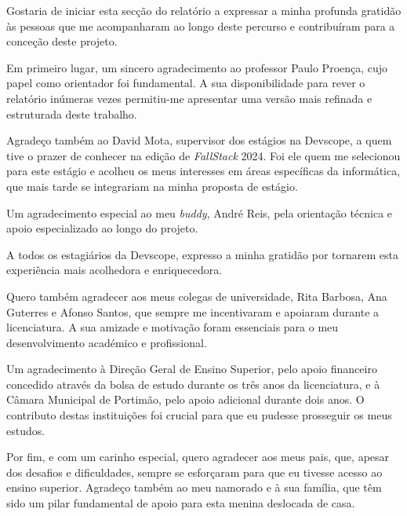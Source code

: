 \begin{acknowledgements}

Gostaria de iniciar esta secção do relatório a expressar a minha profunda gratidão às pessoas que me acompanharam ao longo deste percurso e contribuíram para a conceção deste projeto.

Em primeiro lugar, um sincero agradecimento ao professor Paulo Proença, cujo papel como orientador foi fundamental. A sua disponibilidade para rever o relatório inúmeras vezes permitiu-me apresentar uma versão mais refinada e estruturada deste trabalho.

Agradeço também ao David Mota, supervisor dos estágios na Devscope, a quem tive o prazer de conhecer na edição de \textit{FallStack} 2024. Foi ele quem me selecionou para este estágio e acolheu os meus interesses em áreas específicas da informática, que mais tarde se integrariam na minha proposta de estágio.

Um agradecimento especial ao meu \textit{buddy}, André Reis, pela orientação técnica e apoio especializado ao longo do projeto.

A todos os estagiários da Devscope, expresso a minha gratidão por tornarem esta experiência mais acolhedora e enriquecedora.

Quero também agradecer aos meus colegas de universidade, Rita Barbosa, Ana Guterres e Afonso Santos, que sempre me incentivaram e apoiaram durante a licenciatura. A sua amizade e motivação foram essenciais para o meu desenvolvimento académico e profissional.

Um agradecimento à Direção Geral de Ensino Superior, pelo apoio financeiro concedido através da bolsa de estudo durante os três anos da licenciatura, e à Câmara Municipal de Portimão, pelo apoio adicional durante dois anos. O contributo destas instituições foi crucial para que eu pudesse prosseguir os meus estudos.

Por fim, e com um carinho especial, quero agradecer aos meus pais, que, apesar dos desafios e dificuldades, sempre se esforçaram para que eu tivesse acesso ao ensino superior. Agradeço também ao meu namorado e à sua família, que têm sido um pilar fundamental de apoio para esta menina deslocada de casa.
\end{acknowledgements}


